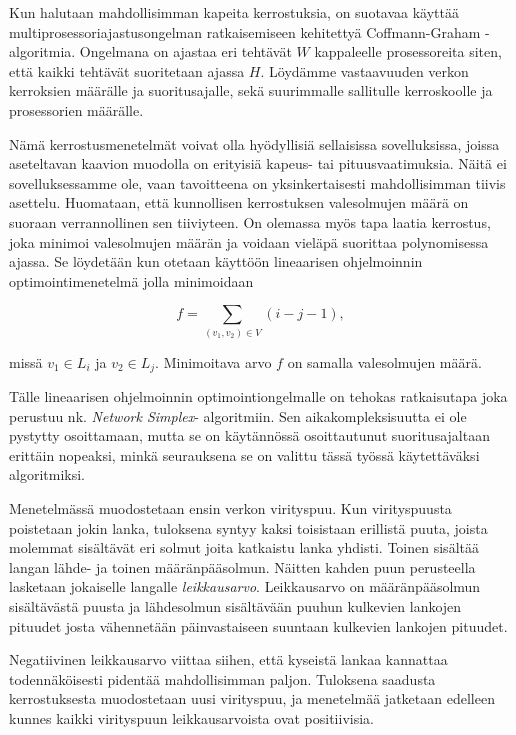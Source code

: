 \documentclass[finnish,12pt]{article}
\begin{document}
Kun halutaan mahdollisimman kapeita kerrostuksia, on suotavaa käyttää multiprosessoriajastusongelman ratkaisemiseen kehitettyä Coffmann-Graham -algoritmia. \cite{RefWorks:59}
Ongelmana on ajastaa eri tehtävät $W$ kappaleelle prosessoreita siten, että kaikki tehtävät suoritetaan ajassa $H$.
Löydämme vastaavuuden verkon kerroksien määrälle ja suoritusajalle, sekä suurimmalle sallitulle kerroskoolle ja prosessorien määrälle.

Nämä kerrostusmenetelmät voivat olla hyödyllisiä sellaisissa sovelluksissa, joissa aseteltavan kaavion muodolla on erityisiä kapeus- tai pituusvaatimuksia.
Näitä ei sovelluksessamme ole, vaan tavoitteena on yksinkertaisesti mahdollisimman tiivis asettelu.
Huomataan, että kunnollisen kerrostuksen valesolmujen määrä on suoraan verrannollinen sen tiiviyteen.
On olemassa myös tapa laatia kerrostus, joka minimoi valesolmujen määrän ja voidaan vieläpä suorittaa polynomisessa ajassa.
Se löydetään kun otetaan käyttöön lineaarisen ohjelmoinnin optimointimenetelmä jolla minimoidaan

$$f=\displaystyle\sum\limits_{(v_1,v_2) \in V} (i - j - 1),$$

missä $v_1 \in L_i$ ja $v_2 \in L_j$. Minimoitava arvo $f$ on samalla valesolmujen määrä.

Tälle lineaarisen ohjelmoinnin optimointiongelmalle on tehokas ratkaisutapa joka perustuu nk. \emph{Network Simplex}- algoritmiin\cite{RefWorks:28}. Sen aikakompleksisuutta ei ole pystytty osoittamaan, mutta se on käytännössä osoittautunut suoritusajaltaan erittäin nopeaksi, minkä seurauksena se on valittu tässä työssä käytettäväksi algoritmiksi.

Menetelmässä muodostetaan ensin verkon virityspuu.
Kun virityspuusta poistetaan jokin lanka, tuloksena syntyy kaksi toisistaan erillistä puuta, joista molemmat sisältävät eri solmut joita katkaistu lanka yhdisti.
Toinen sisältää langan lähde- ja toinen määränpääsolmun.
Näitten kahden puun perusteella lasketaan jokaiselle langalle \emph{leikkausarvo}.
Leikkausarvo on määränpääsolmun sisältävästä puusta ja lähdesolmun sisältävään puuhun kulkevien lankojen pituudet
josta vähennetään päinvastaiseen suuntaan kulkevien lankojen pituudet.

Negatiivinen leikkausarvo viittaa siihen, että kyseistä lankaa kannattaa todennäköisesti pidentää mahdollisimman paljon.
Tuloksena saadusta kerrostuksesta muodostetaan uusi virityspuu, ja menetelmää jatketaan edelleen kunnes kaikki virityspuun leikkausarvoista ovat positiivisia.
\end{document}

